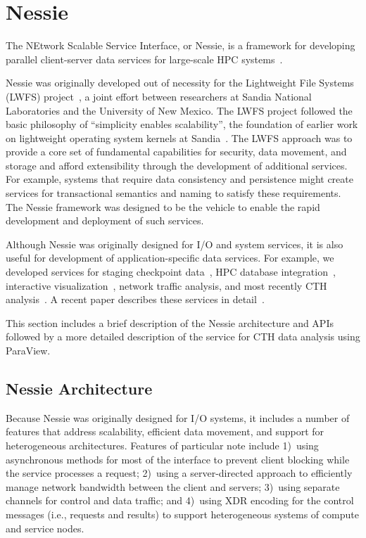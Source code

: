 \section{Nessie}
\label{sec:Nessie}

The NEtwork Scalable Service Interface, or Nessie, is a framework for developing
parallel client-server data services for large-scale HPC
systems~\cite{lofstead:2011:nessie-staging,oldfield:lwfs-data-movement,oldfield:2012:uGNI}. 

Nessie was originally developed out of necessity for the Lightweight File
Systems (LWFS) project~\cite{oldfield:lwfs}, a joint effort between researchers
at Sandia National Laboratories and the University of New Mexico. The LWFS
project followed the basic philosophy of ``simplicity enables scalability'',
the foundation of earlier work on lightweight operating system kernels at
Sandia~\cite{riesen:ccpe-lwk}. The LWFS approach was to provide a core set of
fundamental capabilities for security, data movement, and storage and afford
extensibility through the development of additional services. For example,
systems that require data consistency and persistence might create services for
transactional semantics and naming to satisfy these requirements. The Nessie
framework was designed to be the vehicle to enable the rapid development and 
deployment of such services.  


Although Nessie was originally designed for I/O and system services, it is also
useful for development of application-specific data services.  For example, 
we developed services for staging checkpoint
data~\cite{oldfield:ft-ldrd-tr,reiss:checkpoint-proxy,oldfield:modeling_checkpoints},
HPC database integration~\cite{oldfield:sql-proxy}, interactive
visualization~\cite{oldfield:multilingual-siam}, network traffic analysis, and 
most recently CTH \intransit analysis~\cite{moreland:2011:in-transit}.  A recent
paper describes these services in detail~\cite{lofstead:2013:data-staging}.


This section includes a brief description of the Nessie architecture and APIs followed
by a more detailed description of the \intransit service for CTH data analysis using 
ParaView.  


\subsection{Nessie Architecture}

Because Nessie was originally designed for I/O systems, it includes a number of
features that address scalability, efficient data movement, and support for
heterogeneous architectures. Features of particular note include 1)~using
asynchronous methods for most of the interface to prevent client blocking while
the service processes a request; 2)~using a server-directed approach to
efficiently manage network bandwidth between the client and servers; 3)~using
separate channels for control and data traffic; and 4)~using XDR encoding for
the control messages (i.e., requests and results) to support heterogeneous
systems of compute and service nodes.

